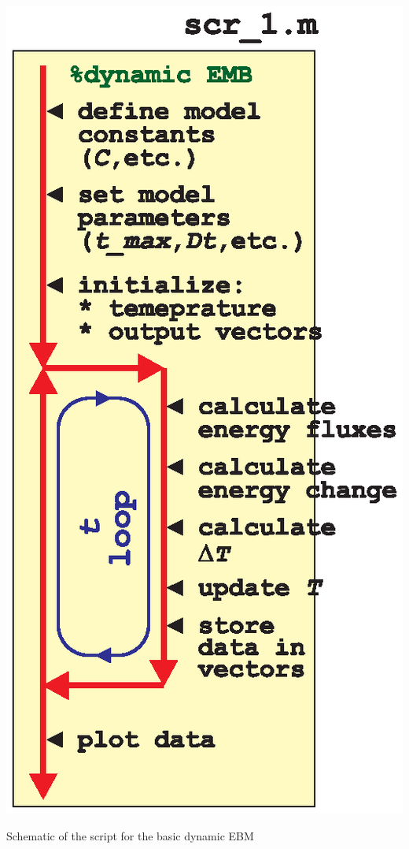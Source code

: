 \documentclass{tufte-book} %
\begin{document}
\begin{marginfigure}[-1.5in]
\includegraphics[width=\linewidth]{ch9-schematic-scr1.eps}
\caption{Schematic of the script for the basic dynamic EBM}
\label{fig:ch9-schematic-scr1}
\end{marginfigure}
\end{document}

